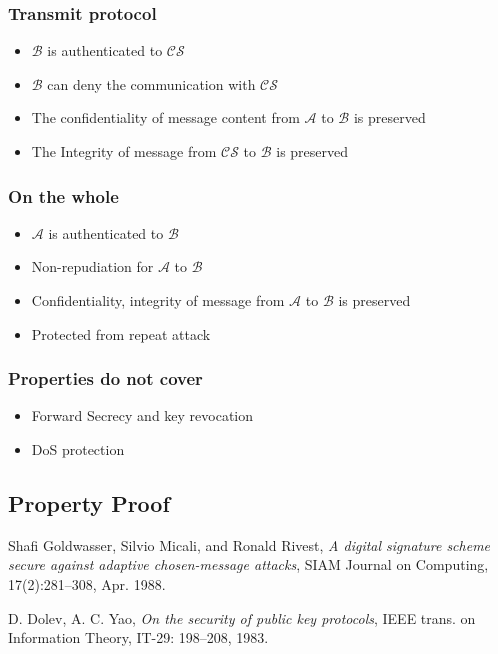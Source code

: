 \documentclass[10pt,a4paper]{article}
\begin{document}
\subsubsection*{Transmit protocol}
\begin{itemize}
\item $\mathcal{B}$ is authenticated to $\mathcal{CS}$
\item $\mathcal{B}$ can deny the communication with $\mathcal{CS}$
\item The confidentiality of message content from $\mathcal{A}$ to $\mathcal{B}$ is preserved
\item The Integrity of message from $\mathcal{CS}$ to $\mathcal{B}$ is preserved
\end{itemize}

\subsubsection*{On the whole}
\begin{itemize}
\item $\mathcal{A}$ is authenticated to $\mathcal{B}$
\item Non-repudiation for $\mathcal{A}$ to $\mathcal{B}$
\item Confidentiality, integrity of message from $\mathcal{A}$ to $\mathcal{B}$ is preserved
\item Protected from repeat attack
\end{itemize}

\subsubsection*{Properties do not cover}
\begin{itemize}
\item Forward Secrecy and key revocation
\item DoS protection
\end{itemize}

\subsection*{Property Proof}

\begin{thebibliography}{9}
  Shafi Goldwasser, Silvio Micali, and Ronald Rivest,
  \emph{A digital signature scheme secure against adaptive chosen-message attacks},  SIAM Journal on Computing,
  17(2):281–308,
  Apr. 1988.
  
  D. Dolev, A. C. Yao,
  \emph{On the security of public key protocols},
  IEEE trans. on Information Theory,
  IT-29: 198–208,
  1983.
\end{thebibliography}
\end{document}
